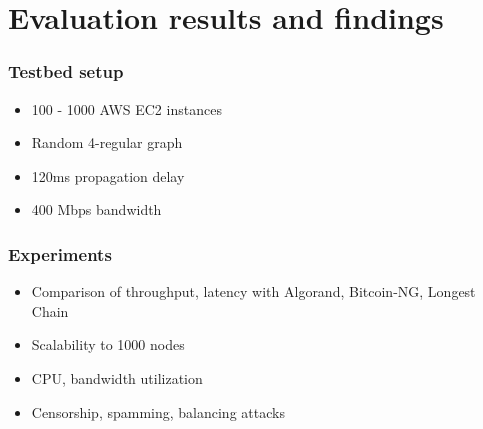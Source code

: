 \documentclass[aspectratio=169]{beamer}
\begin{document}
\section{Evaluation results and findings}


\begin{frame}
\end{frame}

\begin{frame}
    \frametitle{Testbed setup}
    \begin{itemize}
        \item 100 - 1000 AWS EC2 instances
        \item Random 4-regular graph
        \item 120ms propagation delay
        \item 400 Mbps bandwidth
    \end{itemize}
\end{frame}

\begin{frame}
    \frametitle{Experiments}
        \begin{itemize}
            \item \alert<2>{Comparison of throughput, latency with Algorand, Bitcoin-NG, Longest Chain}
            \item Scalability to 1000 nodes
            \item \alert<2>{CPU, bandwidth utilization}
            \item Censorship, spamming, balancing attacks
        \end{itemize}
\end{frame}
\end{document}
